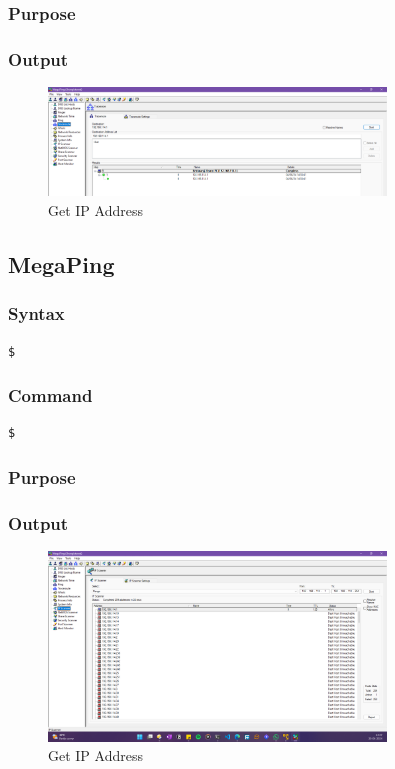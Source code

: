 \documentclass[11pt]{article}
\begin{document}
\subsubsection*{Purpose}

\subsubsection*{Output}
\begin{figure}[H]
    \centering
    \includegraphics[width=0.8\textwidth]{megaping (3).png}
    \caption{Get IP Address}
    \label{fig:1}
\end{figure}
\subsection{MegaPing}

\subsubsection*{Syntax}
\begin{verbatim}
$
\end{verbatim}

\subsubsection*{Command}
\begin{verbatim}
$
\end{verbatim}

\subsubsection*{Purpose}

\subsubsection*{Output}
\begin{figure}[H]
    \centering
    \includegraphics[width=0.8\textwidth]{megaping (4).png}
    \caption{Get IP Address}
    \label{fig:1}
\end{figure}
\end{document}
